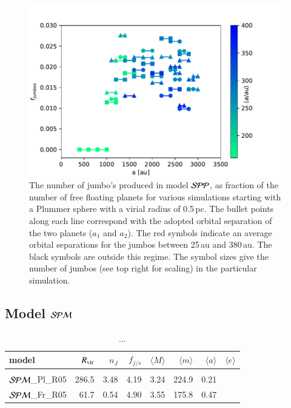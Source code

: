 \documentclass[aa]{lib/aa}
\begin{document}
\begin{figure}
    \centering
        \includegraphics[width=.91\columnwidth]{figures/fig_fjumbos_from_psystems.pdf}
        \caption{The number of jumbo's produced in model ${\cal SPP}$,
          as fraction of the number of free floating planets for
          various simulations starting with a Plummer sphere with a
          virial radius of 0.5\,pc.  The bullet points along each line
          correspond with the adopted orbital separation of the two
          planets ($a_1$ and $a_2$).  The red symbols indicate an
          average orbital separations for the jumbos between 25\,au
          and 380\,au.  The black symbols are outside this regime.
          The symbol sizes give the number of jumbos (see top right
          for scaling) in the particular simulation.  }
         \label{Fig:fjumbos_from_PP}
\end{figure}

\subsection{Model ${\cal SPM}$}


\begin{table}
 \caption{...}
 \label{Tab:model_SPM}
 \centering 
 \begin{tabular}{lrrrrrrr}
   \hline\hline
model &$R_{\rm vir}$ & $n_J$ & $f_{j/s}$ & $\langle M \rangle$ & $\langle m \rangle$ & $\langle a \rangle$ & $\langle e \rangle$ \\
        \hline \vspace{-0.75em}\\
${\cal SPM}$\_Pl\_R05 & 286.5 &3.48& 4.19  & 3.24 & 224.9 & 0.21 \\
${\cal SPM}$\_Fr\_R05 &  61.7 &0.54& 4.90  & 3.55 & 175.8 & 0.47 \\ 
 \hline
 \end{tabular}
\end{table}
\end{document}
